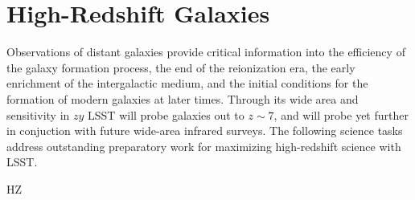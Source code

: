 \section{High-Redshift Galaxies}\label{sec:tasks:high_z}  

Observations of distant galaxies provide critical information
into the efficiency of the galaxy formation process, the end
of the reionization era, the early enrichment of the intergalactic
medium, and the initial conditions for the formation of modern
galaxies at later times. Through its wide area and sensitivity
in $zy$ LSST will probe galaxies out to $z\sim7$, and will probe
yet further in conjuction with future wide-area infrared surveys.
The following science tasks address outstanding preparatory work
for maximizing high-redshift science with LSST.

\begin{tasklist}{HZ}


\end{tasklist}
